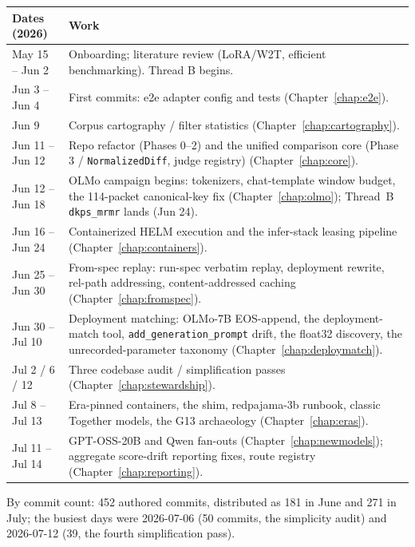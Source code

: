 \documentclass[11pt]{report}
\newcommand{\code}[1]{\texttt{#1}}
\begin{document}
\begin{longtable}{@{}p{}p{}@{}}
\toprule
\textbf{Dates (2026)} & \textbf{Work} \\
\midrule
\endhead
May 15 -- Jun 2  & Onboarding; literature review (LoRA/W2T, efficient benchmarking).
    Thread B begins. \\
Jun 3 -- Jun 4   & First commits: e2e adapter config and tests (Chapter~\ref{chap:e2e}). \\
Jun 9            & Corpus cartography / filter statistics (Chapter~\ref{chap:cartography}). \\
Jun 11 -- Jun 12 & Repo refactor (Phases 0--2) and the unified comparison core
    (Phase 3 / \code{NormalizedDiff}, judge registry) (Chapter~\ref{chap:core}). \\
Jun 12 -- Jun 18 & OLMo campaign begins: tokenizers, chat-template window budget,
    the 114-packet canonical-key fix (Chapter~\ref{chap:olmo});
    Thread~B \code{dkps\_mrmr} lands (Jun 24). \\
Jun 16 -- Jun 24 & Containerized HELM execution and the infer-stack leasing pipeline
    (Chapter~\ref{chap:containers}). \\
Jun 25 -- Jun 30 & From-spec replay: run-spec verbatim replay, deployment rewrite,
    rel-path addressing, content-addressed caching (Chapter~\ref{chap:fromspec}). \\
Jun 30 -- Jul 10 & Deployment matching: OLMo-7B EOS-append, the deployment-match
    tool, \code{add\_generation\_prompt} drift, the float32 discovery, the
    unrecorded-parameter taxonomy (Chapter~\ref{chap:deploymatch}). \\
Jul 2 / 6 / 12   & Three codebase audit / simplification passes
    (Chapter~\ref{chap:stewardship}). \\
Jul 8 -- Jul 13  & Era-pinned containers, the shim, redpajama-3b runbook, classic
    Together models, the G13 archaeology (Chapter~\ref{chap:eras}). \\
Jul 11 -- Jul 14 & GPT-OSS-20B and Qwen fan-outs (Chapter~\ref{chap:newmodels});
    aggregate score-drift reporting fixes, route registry
    (Chapter~\ref{chap:reporting}). \\
\bottomrule
\end{longtable}

By commit count: 452 authored commits, distributed as 181 in June and 271 in July;
the busiest days were 2026-07-06 (50 commits, the simplicity audit) and 2026-07-12
(39, the fourth simplification pass).
\end{document}
